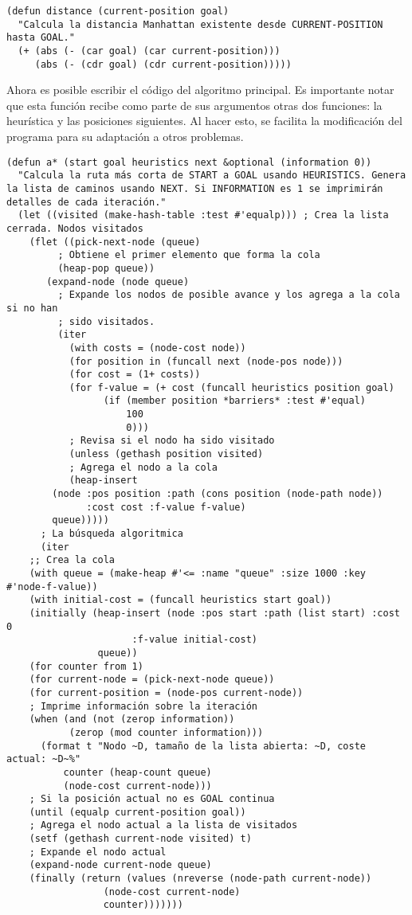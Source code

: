 \documentclass[a4paper,12pt]{article}
\begin{document}
\lstset{language=Lisp,label= ,caption= ,captionpos=b,numbers=none,numbers=left}
\begin{lstlisting}
(defun distance (current-position goal)
  "Calcula la distancia Manhattan existente desde CURRENT-POSITION hasta GOAL."
  (+ (abs (- (car goal) (car current-position)))
     (abs (- (cdr goal) (cdr current-position)))))
\end{lstlisting}

Ahora es posible escribir el código del algoritmo principal. Es importante notar que esta función recibe como parte de sus argumentos otras dos funciones: la heurística y las posiciones siguientes. Al hacer esto, se facilita la modificación del programa para su adaptación a otros problemas.

\lstset{language=Lisp,label= ,caption= ,captionpos=b,numbers=none,numbers=left}
\begin{lstlisting}
(defun a* (start goal heuristics next &optional (information 0))
  "Calcula la ruta más corta de START a GOAL usando HEURISTICS. Genera la lista de caminos usando NEXT. Si INFORMATION es 1 se imprimirán detalles de cada iteración."
  (let ((visited (make-hash-table :test #'equalp))) ; Crea la lista cerrada. Nodos visitados
    (flet ((pick-next-node (queue)
	     ; Obtiene el primer elemento que forma la cola
	     (heap-pop queue))
	   (expand-node (node queue)
	     ; Expande los nodos de posible avance y los agrega a la cola si no han
	     ; sido visitados.
	     (iter
	       (with costs = (node-cost node))
	       (for position in (funcall next (node-pos node)))
	       (for cost = (1+ costs))
	       (for f-value = (+ cost (funcall heuristics position goal)
				 (if (member position *barriers* :test #'equal)
				     100
				     0)))
	       ; Revisa si el nodo ha sido visitado
	       (unless (gethash position visited)
	       ; Agrega el nodo a la cola
	       (heap-insert
		(node :pos position :path (cons position (node-path node))
		      :cost cost :f-value f-value)
		queue)))))
      ; La búsqueda algoritmica
      (iter
	;; Crea la cola
	(with queue = (make-heap #'<= :name "queue" :size 1000 :key #'node-f-value))
	(with initial-cost = (funcall heuristics start goal))
	(initially (heap-insert (node :pos start :path (list start) :cost 0
				      :f-value initial-cost)
				queue))
	(for counter from 1)
	(for current-node = (pick-next-node queue))
	(for current-position = (node-pos current-node))
	; Imprime información sobre la iteración
	(when (and (not (zerop information))
		   (zerop (mod counter information)))
	  (format t "Nodo ~D, tamaño de la lista abierta: ~D, coste actual: ~D~%"
		  counter (heap-count queue)
		  (node-cost current-node)))
	; Si la posición actual no es GOAL continua
	(until (equalp current-position goal))
	; Agrega el nodo actual a la lista de visitados
	(setf (gethash current-node visited) t)
	; Expande el nodo actual
	(expand-node current-node queue)
	(finally (return (values (nreverse (node-path current-node))
				 (node-cost current-node)
				 counter)))))))
\end{lstlisting}
\end{document}
